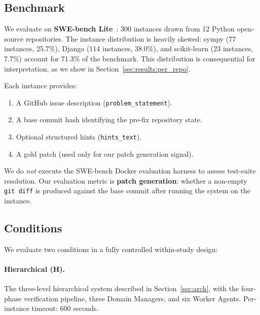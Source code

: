 
\subsection{Benchmark}
\label{sec:exp:benchmark}

We evaluate on \textbf{SWE-bench Lite}~\cite{jimenez2024swebench}: 300
instances drawn from 12 Python open-source repositories. The instance
distribution is heavily skewed: sympy (77 instances, 25.7\%), Django (114
instances, 38.0\%), and scikit-learn (23 instances, 7.7\%) account for
71.3\% of the benchmark. This distribution is consequential for
interpretation, as we show in Section~\ref{sec:results:per_repo}.

Each instance provides:
\begin{enumerate}
  \item A GitHub issue description (\texttt{problem\_statement}).
  \item A base commit hash identifying the pre-fix repository state.
  \item Optional structured hints (\texttt{hints\_text}).
  \item A gold patch (used only for our patch generation signal).
\end{enumerate}

\noindent We do \emph{not} execute the SWE-bench Docker evaluation harness
to assess test-suite resolution. Our evaluation metric is \textbf{patch
generation}: whether a non-empty \texttt{git diff} is produced against the
base commit after running the system on the instance.

\subsection{Conditions}
\label{sec:exp:conditions}

We evaluate two conditions in a fully controlled within-study design:

\paragraph{Hierarchical (H).}
The three-level hierarchical system described in Section~\ref{sec:arch},
with the four-phase verification pipeline, three Domain Managers, and six
Worker Agents. Per-instance timeout: 600 seconds.

